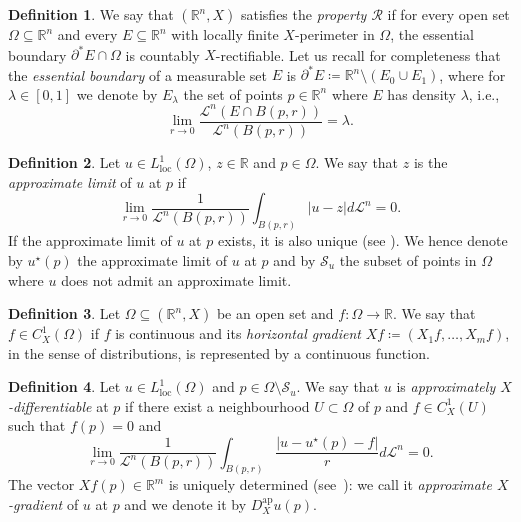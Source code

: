 \documentclass[12pt,a4paper]{amsart}
\theoremstyle{definition}
\newtheorem{defi}{Definition}[section]
\theoremstyle{plain}
\newcommand{\R}{\mathbb{R}}
\newcommand{\se}{\subseteq}
\newcommand{\ceq}{\coloneqq}
\newcommand{\leb}{\mathcal{L}}
\newcommand{\loc}{\operatorname{loc}}
\newcommand{\ap}{{\operatorname{ap}}}
\begin{document}
\begin{defi}\label{def_pror}
      We say that $(\R^n,X)$ satisfies the \emph{property $\mathcal{R}$} if for every open set $\Omega \se \R^n$ and every $E \se \R^n$ with locally finite $X$-perimeter in $\Omega$, the essential boundary $\partial^* E \cap \Omega$ is countably $X$-rectifiable. Let us recall for completeness that the \emph{essential boundary} of a measurable set $E$ is $\partial^*E \ceq \R^n \setminus (E_0 \cup E_1)$, where for $\lambda \in [0,1]$ we denote by $E_\lambda$ the set of points $p\in\R^n$ where $E$ has density $\lambda$, i.e., 
    \[
    \lim_{r \to 0}\frac{\leb^n(E \cap B(p,r))}{\leb^n(B(p,r))}=\lambda.
    \]
    \end{defi}



\begin{defi}\label{def_applim}
    Let $u \in L^1_{\loc}(\Omega)$, $z \in \R$ and $p \in \Omega$. We say that $z$ is the \emph{approximate limit} of $u$ at $p$ if
    \[
    \lim_{r \to 0} \frac{1}{\leb^n(B(p,r))} \int_{B(p,r)}|u-z|d\leb^n=0.
    \]
If the approximate limit of $u$ at $p$ exists, it is also unique (see \cite[Definition 2.19]{dv}). We hence denote by $u^\star(p)$ the approximate limit of $u$ at $p$ and by $\mathcal{S}_u$ the subset of points in $\Omega$ where $u$ does not admit an approximate limit. 
\end{defi}

\begin{defi}\label{def_c1x}
Let $\Omega \se (\R^n,X)$ be an open set and $f\colon \Omega \to \R$. We say that $f \in C^1_X(\Omega)$ if $f$ is continuous and its \emph{horizontal gradient}  $Xf \ceq (X_1f,\dots,X_mf)$,   in the sense of distributions, is represented by a continuous function.
\end{defi}

\begin{defi}\label{def_approxdiff}
    Let $u \in L^1_{\loc}(\Omega)$ and $p \in \Omega \setminus \mathcal{S}_u$. We say that $u$ is \emph{approximately $X$-differentiable} at $p$ if there exist a neighbourhood $U\subset \Omega$ of $p$ and $f \in C^1_X(U)$ such that $f(p)=0$ and
    \[
    \lim_{r \to 0} \frac{1}{\leb^n(B(p,r))} \int_{B(p,r)} \frac{|u-u^\star (p)-f|}{r}d \leb^n =0.
    \]
The vector $Xf(p) \in \R^m$ is uniquely determined (see~\cite[Proposition 2.30]{dv}): we call it \emph{approximate $X$-gradient} of $u$ at $p$ and we denote it by $D^\ap_X u(p)$.
\end{defi}
\end{document}
